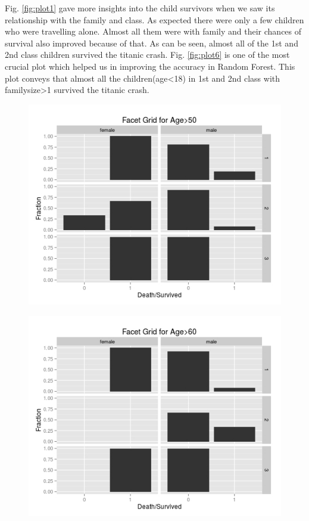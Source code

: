 Fig. \ref{fig:plot1} gave more insights into the child survivors when we saw its relationship with the family and class. As expected there were only a few children who were travelling alone. Almost all them were with family and their chances of survival also improved because of that. As can be seen, almost all of the 1st and 2nd class children survived the titanic crash.
Fig. \ref{fig:plot6} is one of the most crucial plot which helped us in improving the accuracy in Random Forest. This plot conveys that almost all the children(age<18) in 1st and 2nd class with familysize>1 survived the titanic crash.

\begin{figure}
\centering
\begin{minipage}{.5\textwidth}
  \centering
  \includegraphics[width=1\linewidth]{figs/plot4}
  \label{fig:plot4}
\end{minipage}%
\begin{minipage}{.5\textwidth}
  \centering
  \includegraphics[width=1\linewidth]{figs/plot2}

\end{minipage}
\end{figure}
